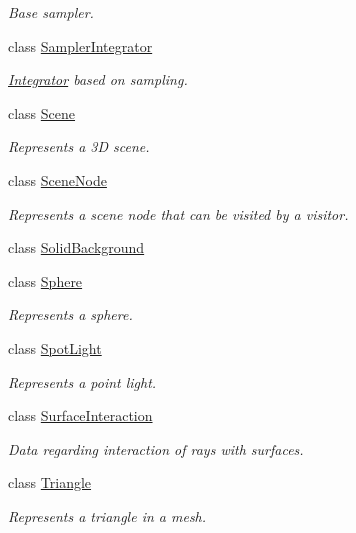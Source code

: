 \begin{DoxyCompactItemize}
\begin{DoxyCompactList}\small\item\em Base sampler. \end{DoxyCompactList}\item 
class \mbox{\hyperlink{classomg_1_1_sampler_integrator}{Sampler\+Integrator}}
\begin{DoxyCompactList}\small\item\em \mbox{\hyperlink{classomg_1_1_integrator}{Integrator}} based on sampling. \end{DoxyCompactList}\item 
class \mbox{\hyperlink{classomg_1_1_scene}{Scene}}
\begin{DoxyCompactList}\small\item\em Represents a 3D scene. \end{DoxyCompactList}\item 
class \mbox{\hyperlink{classomg_1_1_scene_node}{Scene\+Node}}
\begin{DoxyCompactList}\small\item\em Represents a scene node that can be visited by a visitor. \end{DoxyCompactList}\item 
class \mbox{\hyperlink{classomg_1_1_solid_background}{Solid\+Background}}
\item 
class \mbox{\hyperlink{classomg_1_1_sphere}{Sphere}}
\begin{DoxyCompactList}\small\item\em Represents a sphere. \end{DoxyCompactList}\item 
class \mbox{\hyperlink{classomg_1_1_spot_light}{Spot\+Light}}
\begin{DoxyCompactList}\small\item\em Represents a point light. \end{DoxyCompactList}\item 
class \mbox{\hyperlink{classomg_1_1_surface_interaction}{Surface\+Interaction}}
\begin{DoxyCompactList}\small\item\em Data regarding interaction of rays with surfaces. \end{DoxyCompactList}\item 
class \mbox{\hyperlink{classomg_1_1_triangle}{Triangle}}
\begin{DoxyCompactList}\small\item\em Represents a triangle in a mesh. \end{DoxyCompactList}\item 

\end{DoxyCompactItemize}
